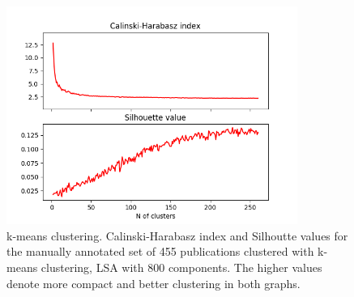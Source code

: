 \begin{figure}[ht]
  \begin{center}    
\includegraphics[width=9.5cm]{images/c-h-silh-index-plot-519-2_260-800-kmeans.png}
    \caption{k-means clustering. Calinski-Harabasz index and Silhoutte values for the
    manually annotated set of 455 publications clustered with k-means 
    clustering, LSA with 800 components. The higher values denote 
    more compact and better clustering in both graphs.}
    \label{fig:ch-silh02}
  \end{center}
\end{figure}

